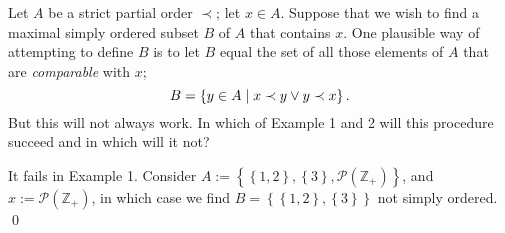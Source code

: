\documentclass[a4paper,12pt]{article}
\begin{document}
\begin{exe}
	Let \( A \) be a strict partial order \( \prec \);
	let \(  x \in A \).
	Suppose that we wish to find a maximal simply ordered subset \( B \) of \( A \)
	that contains \( x \).
	One plausible way of attempting to define \( B \) is to let \( B \) equal the set of all those elements of \( A \) that are \textit{comparable} with \( x \);
	\begin{equation*}
		B=\left\{ y \in A \;|\; x\prec y \vee y \prec x \right\}.
	\end{equation*}
	But this will not always work.
	In which of Example 1 and 2 will this procedure succeed and in which will it not?
\end{exe}
\begin{sol}
	It fails in Example 1.
	Consider
	\( A:=\left\{ \left\{ 1,2 \right\}, \left\{ 3 \right\},\mathcal{P}(\mathbb{Z}_{+}) \right\} \),
	and
	\( x:= \mathcal{P}(\mathbb{Z}_{+}) \),
	in which case we find
	\( B=\left\{ \left\{ 1,2 \right\}, \left\{ 3 \right\} \right\} \) not simply ordered.
	\qed\end{sol}
\end{document}
